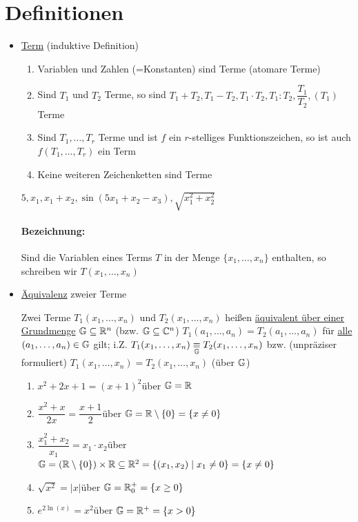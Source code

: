 \section{Definitionen}
\begin{itemize}
	\item \ul{Term} (induktive Definition)
	\begin{enumerate}
		\item Variablen und Zahlen (=Konstanten) sind Terme (atomare Terme)
		\item Sind $T_1$ und $T_2$ Terme, so sind $T_1+T_2, T_1-T_2, T_1\cdot T_2, T_1:T_2, \dfrac{T_1}{T_2}, (T_1)$ Terme
		\item Sind $T_1,\ldots,T_r$ Terme und ist $f$ ein $r$-stelliges Funktionszeichen, so ist auch $f(T_1,\ldots,T_r)$ ein Term
		\item Keine weiteren Zeichenketten sind Terme
	\end{enumerate}
	\Bsp $5,x_1, x_1+x_2, \sin(5x_1+x_2-x_3),\sqrt{x_1^2+x_2^2}$
	\paragraph{Bezeichnung:} Sind die Variablen eines Terms $T$ in der Menge $\{x_1,\ldots,x_n\}$ enthalten, so schreiben wir $T(x_1,\ldots,x_n)$
	
	\clearpage
	\item \ul{Äquivalenz} zweier Terme
	
	Zwei Terme $T_1(x_1,\ldots,x_n)$ und $T_2(x_1,\ldots,x_n)$ heißen \ul{äquivalent über einer Grundmenge} $\mathbb{G}\subseteq \mathbb{R}^n$ (bzw. $\mathbb{G}\subseteq\mathbb{C}^n$) $T_1(a_1,\ldots,a_n) = T_2(a_1,\ldots,a_n)$ für \ul{alle} $(a_1,\ldots,a_n) \in \mathbb{G}$ gilt; i.Z. $T_1(x_1,\ldots,x_n) \underset{\mathbb{G}}{\equiv} T_2(x_1,\ldots,x_n)$ bzw. (unpräziser formuliert) $T_1(x_1,\ldots,x_n) = T_2(x_1,\ldots,x_n)$ (über $\mathbb{G}$)
	
	\Bsps
	\begin{enumerate}
		\item $x^2+2x+1 = (x+1)^2$\qquad über $\mathbb{G} = \mathbb{R}$
		\item $\dfrac{x^2+x}{2x} = \dfrac{x+1}{2}$\qquad über $\mathbb{G} = \mathbb{R}\setminus\{0\} = \{x\ne0\}$
		\item $\dfrac{x_1^2+x_2}{x_1} = x_1\cdot x_2$\qquad über $\mathbb{G} = (\mathbb{R}\setminus\{0\})\times\mathbb{R} \subseteq\mathbb{R}^2= \{(x_1,x_2)\mid x_1\ne0\} = \{x\ne0\}$
		\item $\sqrt{x^2} = |x|$\qquad über $\mathbb{G} = \mathbb{R}_0^+ = \{x\ge0\}$
		\item $e^{2\ln(x)} = x^2$\qquad über $\mathbb{G} = \mathbb{R}^+ = \{x>0\}$
	\end{enumerate}
	

\end{itemize}
